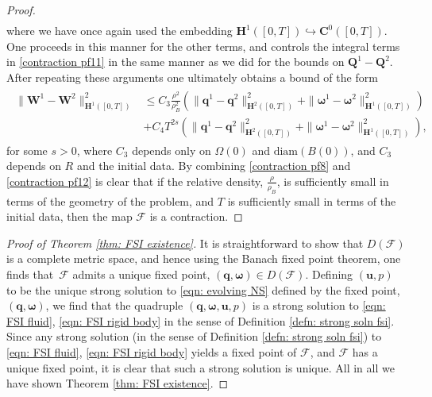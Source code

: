 \documentclass[a4paper]{amsart}
\numberwithin{equation}{section}
\theoremstyle{plain}
\newcommand{\mbf}[1]{\mathbf{#1}}
\begin{document}
\begin{proof}
\begin{align*}
\end{align*}
where we have once again used the embedding $\mbf{H}^1([0,T]) \hookrightarrow \mbf{C}^0([0,T])$.
One proceeds in this manner for the other terms, and controls the integral terms in \eqref{contraction pf11} in the same manner as we did for the bounds on $\mbf{Q}^1 - \mbf{Q}^2$.
After repeating these arguments one ultimately obtains a bound of the form
\begin{align}
\begin{aligned}
    \|\mbf{W}^1 - \mbf{W}^2\|_{\mbf{H}^1([0,T])}^2 &\leq C_3\frac{\rho^2}{\rho_B^2} \left( \|\mbf{q}^1-\mbf{q}^2\|_{\mbf{H}^2([0,T])}^2 + \|\boldsymbol{\omega}^1-\boldsymbol{\omega}^2\|_{\mbf{H}^1([0,T])}^2 \right)\\
    &+ C_4 T^{2s} \left( \|\mbf{q}^1-\mbf{q}^2\|_{\mbf{H}^2([0,T])}^2 + \|\boldsymbol{\omega}^1-\boldsymbol{\omega}^2\|_{\mbf{H}^1([0,T])}^2 \right),
    \end{aligned}
    \label{contraction pf12}
\end{align}
for some $s > 0$, where $C_3$ depends only on $\Omega(0)$ and $\mathrm{diam}(B(0))$, and $C_3$ depends on $R$ and the initial data.
By combining \eqref{contraction pf8} and \eqref{contraction pf12} is clear that if the relative density, $\frac{\rho}{\rho_B}$, is sufficiently small in terms of the geometry of the problem, and $T$ is sufficiently small in terms of the initial data, then the map $\mathscr{F}$ is a contraction.
\end{proof}

\begin{proof}[Proof of Theorem \ref{thm: FSI existence}]
It is straightforward to show that $D(\mathscr{F})$ is a complete metric space, and hence using the Banach fixed point theorem, one finds that~$\mathscr{F}$ admits a unique fixed point, $(\mbf{q}, \boldsymbol{\omega}) \in D(\mathscr{F})$.
Defining $(\mbf{u},p)$ to be the unique strong solution to \eqref{eqn: evolving NS} defined by the fixed point, $(\mbf{q}, \boldsymbol{\omega})$, we find that the quadruple $(\mbf{q}, \boldsymbol{\omega}, \mbf{u}, p)$ is a strong solution to \eqref{eqn: FSI fluid}, \eqref{eqn: FSI rigid body} in the sense of Definition \ref{defn: strong soln fsi}.
Since any strong solution (in the sense of Definition \ref{defn: strong soln fsi}) to \eqref{eqn: FSI fluid}, \eqref{eqn: FSI rigid body} yields a fixed point of $\mathscr{F}$, and $\mathscr{F}$ has a unique fixed point, it is clear that such a strong solution is unique.
All in all we have shown Theorem \ref{thm: FSI existence}.
\end{proof}
\end{document}
